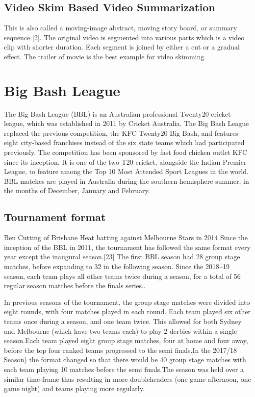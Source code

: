 \section{Video Skim Based Video Summarization}
This is also called a moving-image abstract, moving story board, or summary sequence [2]. The original video is
segmented into various parts which is a video clip with shorter duration. Each segment is joined by either a cut or a
gradual effect. The trailer of movie is the best example for video skimming.

\chapter{Big Bash League}
The Big Bash League (BBL) is an Australian professional Twenty20 cricket league, which was established in 2011 by Cricket Australia. The Big Bash League replaced the previous competition, the KFC Twenty20 Big Bash, and features eight city-based franchises instead of the six state teams which had participated previously. The competition has been sponsored by fast food chicken outlet KFC since its inception. It is one of the two T20 cricket, alongside the Indian Premier League, to feature among the Top 10 Most Attended Sport Leagues in the world.
BBL matches are played in Australia during the southern hemisphere summer, in the months of December, January and February.
\section{Tournament format}
Ben Cutting of Brisbane Heat batting against Melbourne Stars in 2014
Since the inception of the BBL in 2011, the tournament has followed the same format every year except the inaugural season.[23] The first BBL season had 28 group stage matches, before expanding to 32 in the following season.
Since the 2018–19 season, each team plays all other teams twice during a season, for a total of 56 regular season matches before the finals series..

In previous seasons of the tournament, the group stage matches were divided into eight rounds, with four matches played in each round. Each team played six other teams once during a season, and one team twice. This allowed for both Sydney and Melbourne (which have two teams each) to play 2 derbies within a single season.Each team played eight group stage matches, four at home and four away, before the top four ranked teams progressed to the semi finals.In the 2017/18 Season) the format changed so that there would be 40 group stage matches with each team playing 10 matches before the semi finals.The season was held over a similar time-frame thus resulting in more doubleheaders (one game afternoon, one game night) and teams playing more regularly.

